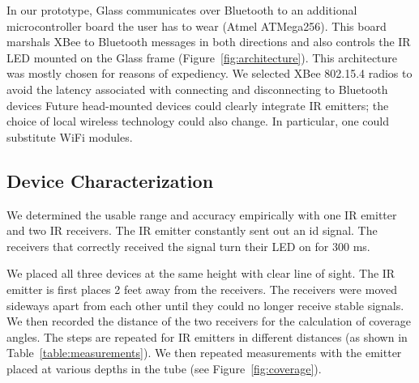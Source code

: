 In our prototype, Glass communicates over Bluetooth to an additional microcontroller board the user has to wear (Atmel ATMega256). This board marshals XBee to Bluetooth messages in both directions and also controls the IR LED mounted on the Glass frame (Figure~\ref{fig:architecture}). This architecture was mostly chosen for reasons of expediency. We selected XBee 802.15.4 radios to avoid the latency associated with connecting and disconnecting to Bluetooth devices   Future head-mounted devices could clearly integrate IR emitters; the choice of local wireless technology could also change. In particular, one could substitute WiFi modules. 

\subsection{Device Characterization}
We determined the usable range and accuracy empirically with one IR emitter and two IR receivers. The IR emitter constantly sent out an id signal. The receivers that correctly received the signal turn their LED on for 300 ms.

We placed all three devices at the same height with clear line of sight. The IR emitter is first places 2 feet away from the receivers. The receivers were moved sideways apart from each other until they could no longer receive stable signals. We then recorded the distance of the two receivers for the calculation of coverage angles. The steps are repeated for IR emitters in different distances (as shown in Table~\ref{table:measurements}). We then repeated measurements with the emitter  placed at various depths in the tube (see Figure~\ref{fig:coverage}). 

